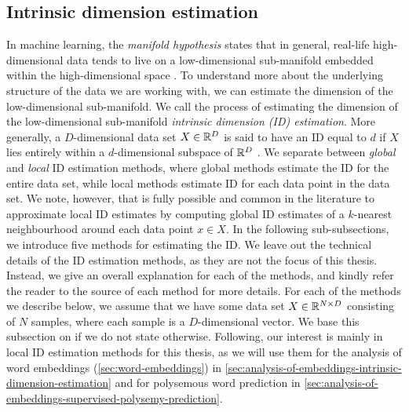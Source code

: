 \subsection{Intrinsic dimension estimation}
\label{sec:intrinsic-dimension-estimation}
In machine learning, the \textit{manifold hypothesis} states that in general, real-life high-dimensional data tends to live on a low-dimensional sub-manifold embedded within the high-dimensional space \cite[p. 16]{bengio2014representation}. To understand more about the underlying structure of the data we are working with, we can estimate the dimension of the low-dimensional sub-manifold. We call the process of estimating the dimension of the low-dimensional sub-manifold \textit{intrinsic dimension (ID) estimation}. More generally, a $D$-dimensional data set $X \in \mathbb{R}^D$ is said to have an ID equal to $d$ if $X$ lies entirely within a $d$-dimensional subspace of $\mathbb{R}^D$ \cite{lee2015intrinsic}. We separate between \textit{global} and \textit{local} ID estimation methods, where global methods estimate the ID for the entire data set, while local methods estimate ID for each data point in the data set. We note, however, that is fully possible and common in the literature to approximate local ID estimates by computing global ID estimates of a $k$-nearest neighbourhood around each data point $x \in X$. In the following sub-subsections, we introduce five methods for estimating the ID. We leave out the technical details of the ID estimation methods, as they are not the focus of this thesis. Instead, we give an overall explanation for each of the methods, and kindly refer the reader to the source of each method for more details. For each of the methods we describe below, we assume that we have some data set $X \in \mathbb{R}^{N \times D}$ consisting of $N$ samples, where each sample is a $D$-dimensional vector. We base this subsection on \cite{lee2015intrinsic} if we do not state otherwise. Following, our interest is mainly in local ID estimation methods for this thesis, as we will use them for the analysis of word embeddings (\cref{sec:word-embeddings}) in \cref{sec:analysis-of-embeddings-intrinsic-dimension-estimation} and for polysemous word prediction in \cref{sec:analysis-of-embeddings-supervised-polysemy-prediction}.

